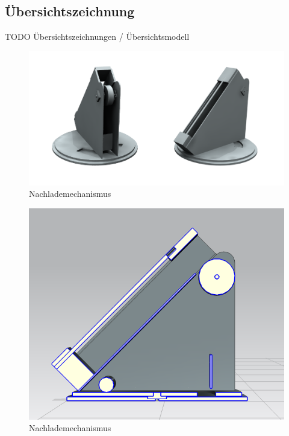 \subsection{Übersichtszeichnung}
TODO Übersichtszeichnungen / Übersichtsmodell

\begin{figure}[h!]
	\centering
	\includegraphics[scale=0.5]{../../fig/Studio.png}
	\caption{Nachlademechanismus}
\end{figure}
\begin{figure}[h!]
	\centering
	\includegraphics[scale=0.5]{../../fig/Schnittansicht.png}
	\caption{Nachlademechanismus}
\end{figure}

